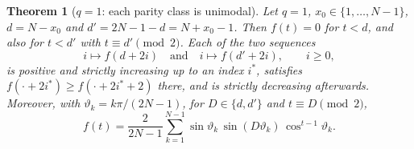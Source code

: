 \documentclass[11pt,a4paper]{article}
\newtheorem{theorem}{Theorem}[section]
\theoremstyle{definition}
\theoremstyle{remark}
\begin{document}
\begin{theorem}[$q=1$: each parity class is unimodal]\label{thm:parity}
Let $q=1$, $x_0\in\{1,\dots,N-1\}$, $d=N-x_0$ and $d'=2N-1-d=N+x_0-1$. Then $f(t)=0$ for $t<d$, and also for
$t<d'$ with $t\equiv d'\pmod 2$. Each of the two sequences
\[
   i\mapsto f(d+2i)\quad\text{and}\quad i\mapsto f(d'+2i),\qquad i\ge0,
\]
is positive and strictly increasing up to an index $i^*$, satisfies $f(\cdot+2i^*)\ge f(\cdot+2i^*+2)$ there,
and is strictly decreasing afterwards. Moreover, with $\vartheta_k=k\pi/(2N-1)$, for $D\in\{d,d'\}$ and
$t\equiv D\pmod2$,
\begin{equation}\label{eq:parityformula}
   f(t)=\frac{2}{2N-1}\sum_{k=1}^{N-1}\sin\vartheta_k\,\sin(D\vartheta_k)\,\cos^{t-1}\vartheta_k .
\end{equation}
\end{theorem}
\end{document}
